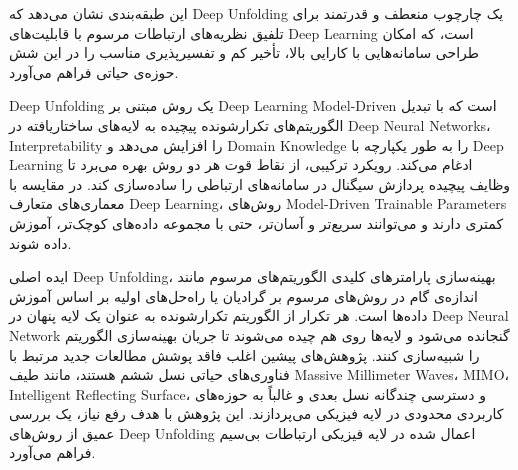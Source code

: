 این طبقه‌بندی نشان می‌دهد که
\gls{Deep Unfolding}
 یک چارچوب منعطف و قدرتمند برای تلفیق نظریه‌های ارتباطات مرسوم با قابلیت‌های 
\gls{Deep Learning}
 است، که امکان طراحی سامانه‌هایی با کارایی بالا، تأخیر کم و تفسیرپذیری مناسب را در این شش حوزه‌ی حیاتی فراهم می‌آورد.


\gls{Deep Unfolding}
یک روش مبتنی بر 
\gls{Deep Learning} 
\gls{Model-Driven}
است که با تبدیل الگوریتم‌های تکرارشونده پیچیده به لایه‌های ساختاریافته در
\glspl{Deep Neural Network}، 
\gls{Interpretability}
را افزایش می‌دهد و 
\gls{Domain Knowledge}
را به طور یکپارچه با 
\gls{Deep Learning}
ادغام می‌کند.  رویکرد ترکیبی، از نقاط قوت هر دو روش بهره می‌برد تا وظایف پیچیده پردازش سیگنال در سامانه‌های ارتباطی را ساده‌سازی کند. در مقایسه با معماری‌های متعارف 
\gls{Deep Learning}،
روش‌های 
\gls{Model-Driven}
\glspl{Trainable Parameter}
کمتری دارند و می‌توانند سریع‌تر و آسان‌تر، حتی با مجموعه داده‌های کوچک‌تر، آموزش داده شوند.

ایده اصلی 
\gls{Deep Unfolding}،
بهینه‌سازی پارامترهای کلیدی الگوریتم‌های مرسوم مانند اندازه‌ی گام در روش‌های مرسوم بر گرادیان یا راه‌حل‌های اولیه بر اساس آموزش داده‌ها است. هر تکرار از الگوریتم تکرارشونده به عنوان یک لایه پنهان در 
\gls{Deep Neural Network}
گنجانده می‌شود و  لایه‌ها روی هم چیده می‌شوند تا جریان بهینه‌سازی الگوریتم را شبیه‌سازی کنند.
پژوهش‌های پیشین اغلب فاقد پوشش مطالعات جدید مرتبط با فناوری‌های حیاتی نسل ششم هستند، مانند طیف 
\glspl{Massive Millimeter Wave}،
\gls{MIMO}،
\gls{Intelligent Reflecting Surface}،
و دسترسی چندگانه نسل بعدی و غالباً به حوزه‌های کاربردی محدودی در لایه فیزیکی می‌پردازند.  این پژوهش با هدف رفع  نیاز، یک بررسی عمیق از روش‌های 
\gls{Deep Unfolding}
اعمال شده در لایه فیزیکی ارتباطات بی‌سیم فراهم می‌آورد.

